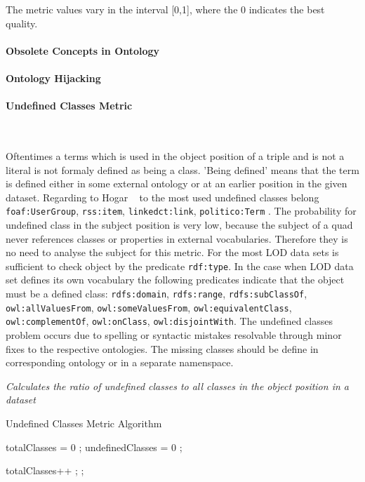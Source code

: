 The metric values vary in the interval [0,1], where  the 0 indicates the best quality.


\paragraph{Obsolete Concepts in Ontology}
\paragraph{Ontology Hijacking}


\paragraph{Undefined Classes Metric} ~\\ 
\label{par:undefClass}

Oftentimes a terms which is used in the object position of a triple and is not a literal is not formaly defined as being a class.
'Being defined' means that the term is defined either in some external ontology or at an earlier position in the given dataset. 
Regarding to Hogar ~\cite{hogan2010} to the most used undefined classes belong \texttt{foaf:UserGroup}, \texttt{rss:item}, \texttt{linkedct:link}, \texttt{politico:Term} .
The probability for undefined class in the subject position is very low, because the subject of a quad never references classes or properties in external vocabularies.
Therefore they is no need to analyse the subject for this metric.
For the most LOD data sets is sufficient to check object by the predicate \texttt{rdf:type}. 
In the case when LOD data set defines its own vocabulary the following predicates indicate that the object must be a defined class:  \texttt{rdfs:domain}, \texttt{rdfs:range}, \texttt{rdfs:subClassOf}, \texttt{owl:allValuesFrom}, \texttt{owl:someValuesFrom}, \texttt{owl:equivalentClass}, \texttt{owl:complementOf}, \texttt{owl:onClass}, \texttt{owl:disjointWith}.
The undefined classes problem occurs due to spelling or syntactic mistakes resolvable through minor fixes to the respective ontologies.
The missing classes should be define in corresponding ontology or in a separate namenspace.


\begin{mdframed}[style=metricdefinition]
\emph{Calculates the ratio of undefined classes to all classes in the object position in a dataset}
\end{mdframed}


\begin{algorithm}
\caption{Undefined Classes Metric Algorithm}\label{lst:undefCl}
\begin{algorithmic}[1]
\State totalClasses = 0 ;
\State undefinedClasses = 0 ;
\EndProcedure

  totalClasses++ ;\EndIf
{}; \EndIf
{}
\EndProcedure
\end{algorithmic}
\end{algorithm}

